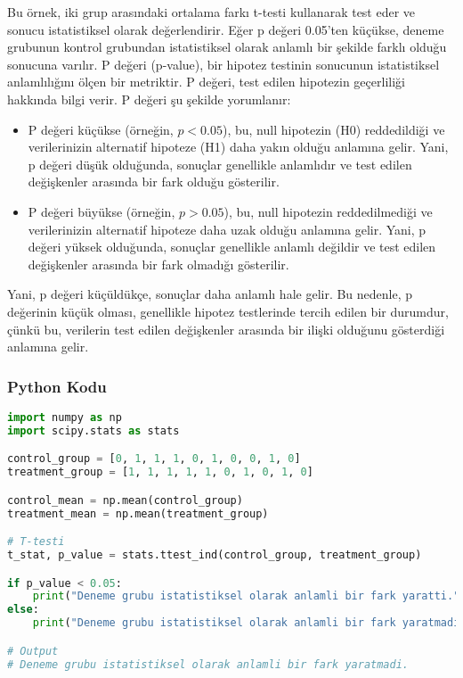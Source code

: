 Bu örnek, iki grup arasındaki ortalama farkı t-testi kullanarak test eder ve sonucu istatistiksel olarak değerlendirir. Eğer p değeri 0.05'ten küçükse, deneme grubunun kontrol grubundan istatistiksel olarak anlamlı bir şekilde farklı olduğu sonucuna varılır. P değeri (p-value), bir hipotez testinin sonucunun istatistiksel anlamlılığını ölçen bir metriktir. P değeri, test edilen hipotezin geçerliliği hakkında bilgi verir. P değeri şu şekilde yorumlanır:
\begin{itemize}
    \item P değeri küçükse (örneğin, $p < 0.05$), bu, null hipotezin (H0) reddedildiği ve verilerinizin alternatif hipoteze (H1) daha yakın olduğu anlamına gelir. Yani, p değeri düşük olduğunda, sonuçlar genellikle anlamlıdır ve test edilen değişkenler arasında bir fark olduğu gösterilir.
    \item P değeri büyükse (örneğin, $p > 0.05$), bu, null hipotezin reddedilmediği ve verilerinizin alternatif hipoteze daha uzak olduğu anlamına gelir. Yani, p değeri yüksek olduğunda, sonuçlar genellikle anlamlı değildir ve test edilen değişkenler arasında bir fark olmadığı gösterilir.
\end{itemize}

Yani, p değeri küçüldükçe, sonuçlar daha anlamlı hale gelir. Bu nedenle, p değerinin küçük olması, genellikle hipotez testlerinde tercih edilen bir durumdur, çünkü bu, verilerin test edilen değişkenler arasında bir ilişki olduğunu gösterdiği anlamına gelir.

\subsubsection{Python Kodu}

\begin{lstlisting}[language=Python]
import numpy as np
import scipy.stats as stats

control_group = [0, 1, 1, 1, 0, 1, 0, 0, 1, 0]
treatment_group = [1, 1, 1, 1, 1, 0, 1, 0, 1, 0]

control_mean = np.mean(control_group)
treatment_mean = np.mean(treatment_group)

# T-testi
t_stat, p_value = stats.ttest_ind(control_group, treatment_group)

if p_value < 0.05:
    print("Deneme grubu istatistiksel olarak anlamli bir fark yaratti.")
else:
    print("Deneme grubu istatistiksel olarak anlamli bir fark yaratmadi.")

# Output
# Deneme grubu istatistiksel olarak anlamli bir fark yaratmadi.
\end{lstlisting}


